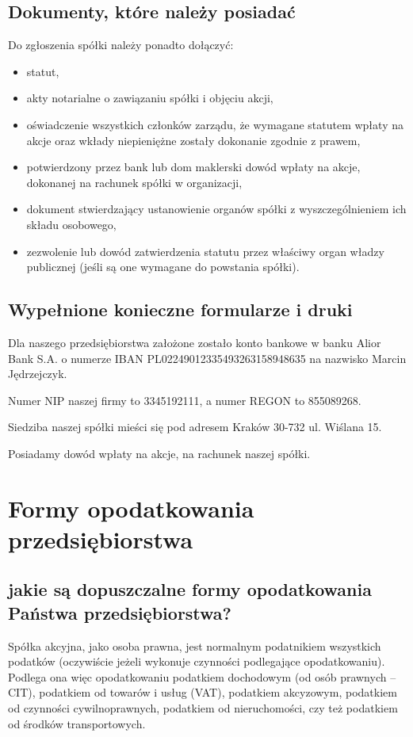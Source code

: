 \documentclass[a4paper, 11pt]{article}
\begin{document}
\subsection{Dokumenty, które należy posiadać}
Do zgłoszenia spółki należy ponadto dołączyć:
\begin{itemize}
\item statut,
\item akty notarialne o zawiązaniu spółki i objęciu akcji,
\item oświadczenie wszystkich członków zarządu, że wymagane statutem wpłaty na akcje oraz wkłady niepieniężne zostały dokonanie zgodnie z prawem,
\item potwierdzony przez bank lub dom maklerski dowód wpłaty na akcje, dokonanej na rachunek spółki w organizacji,
\item dokument stwierdzający ustanowienie organów spółki z wyszczególnieniem ich składu osobowego,
\item zezwolenie lub dowód zatwierdzenia statutu przez właściwy organ władzy publicznej (jeśli są one wymagane do powstania spółki).
\end{itemize}


\subsection{Wypełnione konieczne formularze i druki}
\indent

Dla naszego przedsiębiorstwa założone zostało konto bankowe w banku Alior Bank S.A. o numerze IBAN PL02249012335493263158948635 na nazwisko Marcin Jędrzejczyk.

\indent

Numer NIP naszej firmy to 3345192111, a numer REGON to 855089268.

\indent

Siedziba naszej spółki mieści się pod adresem  Kraków 30-732 ul. Wiślana 15. 

\indent

Posiadamy dowód wpłaty na akcje, na rachunek naszej spółki.



\section{Formy opodatkowania przedsiębiorstwa}

\subsection{jakie są dopuszczalne formy opodatkowania Państwa przedsiębiorstwa?}
Spółka akcyjna, jako osoba prawna, jest normalnym podatnikiem wszystkich podatków (oczywiście jeżeli wykonuje czynności podlegające opodatkowaniu).
Podlega ona więc opodatkowaniu podatkiem dochodowym (od osób prawnych – CIT), podatkiem od towarów i usług (VAT), podatkiem akcyzowym, podatkiem od czynności cywilnoprawnych, podatkiem od nieruchomości, czy też podatkiem od środków transportowych.
\end{document}
